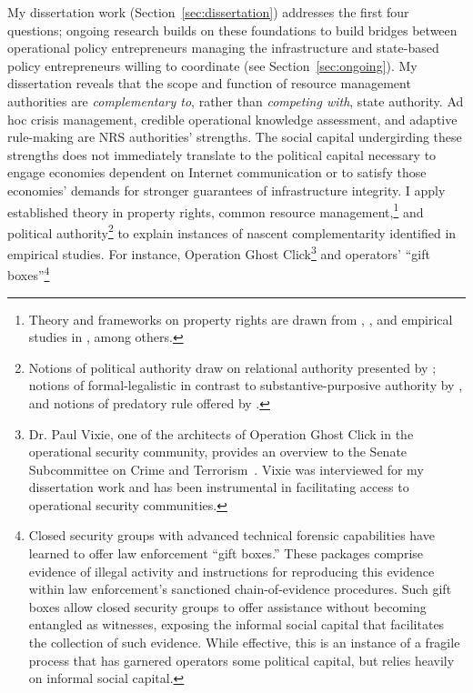 \documentclass[12pt,journal,compsoc,letterpaper,onecolumn,twoside]{IEEEtran}
\begin{document}
My dissertation work (Section~\ref{sec:dissertation}) addresses
the first four questions;
ongoing 
research builds on these foundations to
build bridges between operational policy entrepreneurs managing the
infrastructure and state-based policy entrepreneurs willing to
coordinate (see Section~\ref{sec:ongoing}).
%
My dissertation reveals that the scope and function of
resource management authorities are \emph{complementary to},
rather than \emph{competing with}, state authority. 
%
Ad hoc crisis management, credible operational knowledge assessment,
and adaptive rule-making are NRS authorities' strengths.
%
The social
capital undergirding these strengths does not immediately translate to
the political capital necessary to engage economies dependent on
Internet communication or to satisfy those economies' demands for
stronger guarantees of infrastructure integrity. 
%
I apply established
theory in property rights, common resource
management,\footnote{Theory and frameworks on property rights are drawn 
  from , , and
  empirical studies in , among others.} and
political authority\footnote{Notions of political authority draw on
  relational authority presented by ; notions of
  formal-legalistic in contrast to substantive-purposive authority by
  , and notions of predatory rule offered
  by .} to explain
instances of nascent complementarity identified in empirical studies.
%
For instance, Operation Ghost Click\footnote{Dr. Paul Vixie, one of the
  architects of Operation Ghost Click in the operational security
  community, provides an 
  overview to the Senate Subcommittee on Crime and
  Terrorism~\cite{vixie2014testimony}.  Vixie was interviewed for
  my dissertation work and has been instrumental in facilitating
  access to
  operational security communities.}
and operators' 
``gift boxes''\footnote{Closed security groups with advanced technical
  forensic capabilities have learned to offer law enforcement ``gift
  boxes.''  These packages comprise evidence of illegal activity and
  instructions for reproducing this evidence within law enforcement's
  sanctioned chain-of-evidence procedures.  Such gift boxes allow
  closed security groups to offer assistance without becoming
  entangled as witnesses, exposing the informal social capital that
  facilitates the collection of such evidence.  While effective, this
  is an instance of a fragile process that has garnered operators some
  political capital, but relies heavily on informal social capital.}
\end{document}
